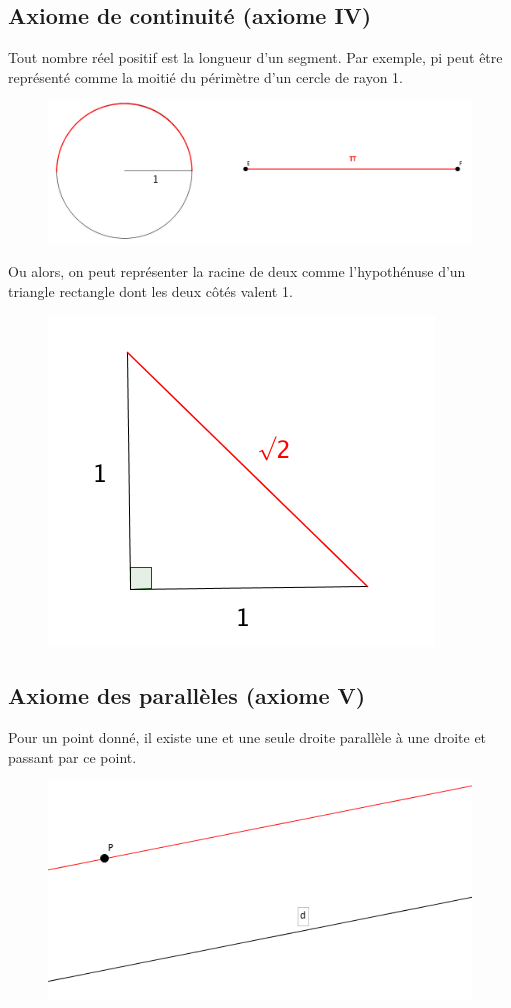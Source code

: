 \documentclass[a4paper,12pt]{article}
\begin{document}
\subsection{Axiome de continuité (axiome IV)}
Tout nombre réel positif est la longueur d'un segment. Par exemple, pi peut être représenté comme la moitié du périmètre d'un cercle de rayon 1.
\begin{figure}[H]
    \centerline{\includegraphics[scale=0.4]{pi.png}}
    \label{fig:fig2}
\end{figure}

\pagebreak
Ou alors, on peut représenter la racine de deux comme l'hypothénuse d'un triangle rectangle dont les deux côtés valent 1.
\begin{figure}[H]
    \centering
    \includegraphics[scale=0.6]{racine2.png}
\end{figure}



\subsection{Axiome des parallèles (axiome V)}
Pour un point donné, il existe une et une seule droite parallèle à une droite et passant par ce point.
\begin{figure}[H]
    \centering
    \includegraphics[scale=0.6]{parallel.png}
\end{figure}
\end{document}
